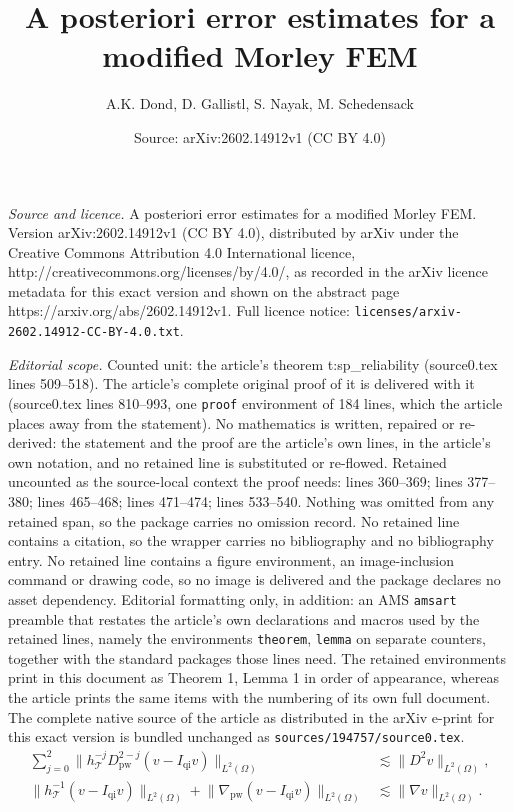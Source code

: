 \documentclass[10pt,a4paper]{amsart}
\title{A posteriori error estimates for a modified Morley FEM}
\author{A.K. Dond, D. Gallistl, S. Nayak, M. Schedensack}
\date{Source: arXiv:2602.14912v1 (CC BY 4.0)}
\newcommand{\pw}{\mathrm{pw}}
\newcommand{\tri}{\mathcal{T}}
\begin{document}
\maketitle

\noindent\emph{Source and licence.} A posteriori error estimates for a modified Morley FEM. Version arXiv:2602.14912v1 (CC BY 4.0), distributed by arXiv under the Creative Commons Attribution 4.0 International licence, http://creativecommons.org/licenses/by/4.0/, as recorded in the arXiv licence metadata for this exact version and shown on the abstract page https://arxiv.org/abs/2602.14912v1. Full licence notice: \texttt{licenses/arxiv-2602.14912-CC-BY-4.0.txt}.\par\smallskip

\noindent\textit{Editorial scope.} Counted unit: the article's theorem t:sp\_reliability (source0.tex lines 509--518). The article's complete original proof of it is delivered with it (source0.tex lines 810--993, one \texttt{proof} environment of 184 lines, which the article places away from the statement). No mathematics is written, repaired or re-derived: the statement and the proof are the article's own lines, in the article's own notation, and no retained line is substituted or re-flowed.  Retained uncounted as the source-local context the proof needs: lines 360--369; lines 377--380; lines 465--468; lines 471--474; lines 533--540.  Nothing was omitted from any retained span, so the package carries no omission record.  No retained line contains a citation, so the wrapper carries no bibliography and no bibliography entry.  No retained line contains a figure environment, an image-inclusion command or drawing code, so no image is delivered and the package declares no asset dependency.  Editorial formatting only, in addition: an AMS \texttt{amsart} preamble that restates the article's own declarations and macros used by the retained lines, namely the environments \texttt{theorem}, \texttt{lemma} on separate counters, together with the standard packages those lines need.  The retained environments print in this document as Theorem 1, Lemma 1 in order of appearance, whereas the article prints the same items with the numbering of its own full document.  The complete native source of the article as distributed in the arXiv e-print for this exact version is bundled unchanged as \texttt{sources/194757/source0.tex}.
\begin{equation}\label{e:quasi_interpolation}
\begin{aligned}
    \sum_{j=0}^2 
    \lVert h_\tri^{-j}D_\pw^{2-j} (v-I_\mathrm{qi} v)\rVert_{L^2(\Omega)}
    &\lesssim \lVert D^2 v\rVert_{L^2(\Omega)},\\
    \lVert h_\tri^{-1}(v-I_\mathrm{qi} v)\rVert_{L^2(\Omega)}
    +\lVert \nabla_\pw (v-I_\mathrm{qi} v)\rVert_{L^2(\Omega)}
    &\lesssim \lVert \nabla v\rVert_{L^2(\Omega)}.
\end{aligned}
\end{equation}
\end{document}
